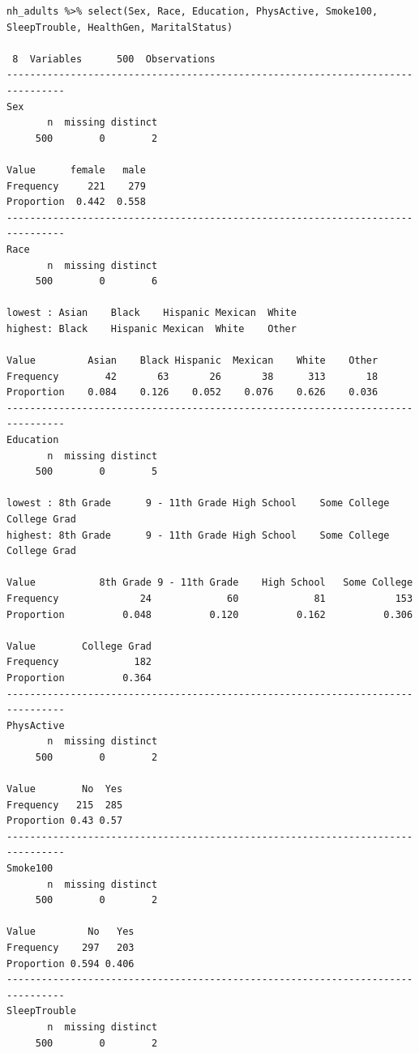 \documentclass[
]{book}
\begin{document}
\begin{verbatim}
nh_adults %>% select(Sex, Race, Education, PhysActive, Smoke100, SleepTrouble, HealthGen, MaritalStatus) 

 8  Variables      500  Observations
--------------------------------------------------------------------------------
Sex 
       n  missing distinct 
     500        0        2 
                        
Value      female   male
Frequency     221    279
Proportion  0.442  0.558
--------------------------------------------------------------------------------
Race 
       n  missing distinct 
     500        0        6 

lowest : Asian    Black    Hispanic Mexican  White   
highest: Black    Hispanic Mexican  White    Other   
                                                                
Value         Asian    Black Hispanic  Mexican    White    Other
Frequency        42       63       26       38      313       18
Proportion    0.084    0.126    0.052    0.076    0.626    0.036
--------------------------------------------------------------------------------
Education 
       n  missing distinct 
     500        0        5 

lowest : 8th Grade      9 - 11th Grade High School    Some College   College Grad  
highest: 8th Grade      9 - 11th Grade High School    Some College   College Grad  
                                                                      
Value           8th Grade 9 - 11th Grade    High School   Some College
Frequency              24             60             81            153
Proportion          0.048          0.120          0.162          0.306
                         
Value        College Grad
Frequency             182
Proportion          0.364
--------------------------------------------------------------------------------
PhysActive 
       n  missing distinct 
     500        0        2 
                    
Value        No  Yes
Frequency   215  285
Proportion 0.43 0.57
--------------------------------------------------------------------------------
Smoke100 
       n  missing distinct 
     500        0        2 
                      
Value         No   Yes
Frequency    297   203
Proportion 0.594 0.406
--------------------------------------------------------------------------------
SleepTrouble 
       n  missing distinct 
     500        0        2 
                    

\end{verbatim}
\end{document}
